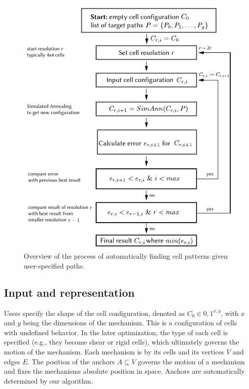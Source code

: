 \begin{figure} [!h]
    \centering
    \includegraphics[width=\textwidth]{chapters/understanding-metamaterial-mechanisms-FIG/13-optimization-overview.pdf}
    \caption[Short figure name.]{Overview of the process of automatically finding cell patterns given user-specified paths.
    \label{fig:13-optimization-overview}}
\end{figure}


\subsection{Input and representation}

Users specify the shape of the cell configuration, denoted as $C_0\in{0,1}^{x,y}$, with $x$ and $y$ being the dimensions of the mechanism. This is a configuration of cells with undefined behavior. In the later optimization, the type of each cell is specified (e.g., they become shear or rigid cells), which ultimately governs the motion of the mechanism. Each mechanism is by its cells and its vertices $V$ and edges $E$. The position of the anchors $A\subseteq V$ governs the motion of a mechanism and fixes the mechanisms absolute position in space. Anchors are automatically determined by our algorithm.

